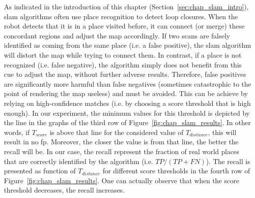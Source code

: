As indicated in the introduction of this chapter (Section~\ref{sec:chap_slam_intro}), \gls*{slam} algorithms often use place recognition to detect loop closures. When the robot detects that it is in a place visited before, it can connect (or merge) these concordant regions and adjust the map accordingly. If two scans are falsely identified as coming from the same place (i.e. a false positive), the \gls*{slam} algorithm will distort the map while trying to connect them. In contrast, if a place is not recognized (i.e. false negative), the algorithm simply does not benefit from this cue to adjust the map, without further adverse results. Therefore, false positives are significantly more harmful than false negatives (sometimes catastrophic to the point of rendering the map useless) and must be avoided. This can be achieve by relying on high-confidence matches (i.e. by choosing a score threshold that is high enough). In our experiment, the minimum values for this threshold is depicted by the line in the graphs of the third row of Figure~\ref{fig:chap_slam_results}. In other words, if $T_{score}$ is above that line for the considered value of $T_{distance}$, this will result in no \gls*{fp}.  Moreover, the closer the value is from that line, the better the recall will be. In our case, the recall represent the fraction of real world places that are correctly identified by the algorithm (i.e. $TP/(TP+FN)$). The recall is presented as function of $T_{distance}$ for different score thresholds in the fourth row of Figure~\ref{fig:chap_slam_results}. One can actually observe that when the score threshold decreases, the recall increases.

